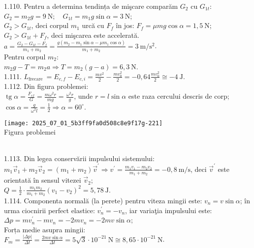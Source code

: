 1.110. Pentru a determina tendința de mişcare comparăm $G_{2}$ cu $G_{1 t}$:\\ $G_{2}=m_{2} g=9 \mathrm{~N}; \quad G_{1 t}=m_{1} g \sin \alpha=3 \mathrm{~N}$;\\ $G_{2}>G_{1 t}$, deci corpul $m_{1}$ urcă cu $F_{f}$ în jos: $F_{f}=\mu m g \cos \alpha=1,5 \mathrm{~N}$;\\ $G_{2}>G_{1 t}+F_{f}$, deci mişcarea este accelerată.\\ $a=\frac{G_{2}-G_{1 t}-F_{f}}{m_{1}+m_{2}}=\frac{g\left(m_{2}-m_{1} \sin \alpha-\mu m_{1} \cos \alpha\right)}{m_{1}+m_{2}}=3 \mathrm{~m} / \mathrm{s}^{2}$.\\ Pentru corpul $m_{2}$:\\ $m_{2} g-T=m_{2} a \Rightarrow T=m_{2}(g-a)=6,3 \mathrm{~N}$.\\

1.111. $L_{\text {frecare }}=E_{c, f}-E_{c, i}=\frac{m v^{2}}{2}-\frac{m v_{0}^{2}}{2}=-0,64 \frac{m v_{0}^{2}}{2} \cong -4 \mathrm{~J}$.\\

1.112. Din figura problemei:\\ $\operatorname{tg} \alpha=\frac{F_{c f}}{G}=\frac{m \omega^{2} r}{m g}=\frac{\omega^{2} r}{g}$, unde $r=l \sin \alpha$ este raza cercului descris de corp;\\ $\cos \alpha=\frac{g}{\omega^{2} l}=\frac{1}{2} \Rightarrow \alpha=60^{\circ}$.\\ \begin{center} \texttt{[image: 2025\_07\_01\_5b3ff9fa0d508c8e9f17g-221]}\\ Figura problemei \end{center}\\

1.113. Din legea conservării impulsului sistemului:\\ $m_{1} \vec{v}_{1}+m_{2} \vec{v}_{2}=\left(m_{1}+m_{2}\right) \vec{v}^{\prime} \Rightarrow v^{\prime}=\frac{m_{1} v_{1}-m_{2} v_{2}}{m_{1}+m_{2}}=-0,8 \mathrm{~m} / \mathrm{s}$, deci $\vec{v}^{\prime}$ este orientată în sensul vitezei $\vec{v}_{2}$;\\ $Q=\frac{1}{2} \cdot \frac{m_{1} m_{2}}{m_{1}+m_{2}}\left(v_{1}-v_{2}\right)^{2}=5,78 \mathrm{~J}$.\\

1.114. Componenta normală (la perete) pentru viteza mingii este: $v_{n}=v \sin \alpha$; în urma ciocnirii perfect elastice: $v_{n}^{\prime}=-v_{n}$, iar variaţia impulsului este:\\ $\Delta p=m v_{n}^{\prime}-m v_{n}=-2 m v_{n}=-2 m v \sin \alpha$;\\ Forța medie asupra mingii:\\ $F_{m}=\frac{|\Delta p|}{\Delta t}=\frac{2 m v \sin \alpha}{\Delta t}=5 \sqrt{3} \cdot 10^{-21} \mathrm{~N} \cong 8,65 \cdot 10^{-21} \mathrm{~N}$.\\

